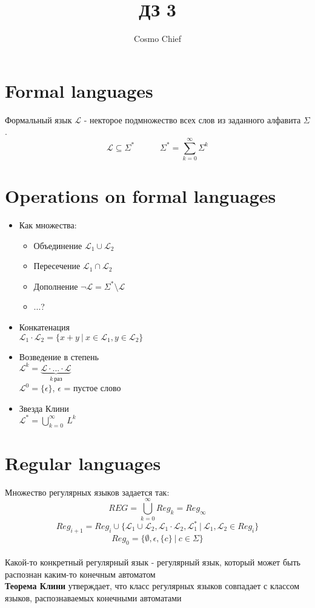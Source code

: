 \documentclass{article}
\title{ДЗ 3}
\author[1]{Cosmo Chief}
\begin{document}
	\maketitle
	\tableofcontents
	\newpage
	\section{Formal languages}
	Формальный язык $\mathcal{L}$ - некторое подмножество всех слов из заданного алфавита $\Sigma$.\\
	\[
	\mathcal{L} \subseteq \Sigma^* \quad \quad \quad \Sigma^* = \sum_{k = 0}^{\infty} \Sigma^k
	\]
	
	\section{Operations on formal languages}
	\begin{itemize}
		\item
		Как множества:
		\begin{itemize}
		\item Объединение \(\mathcal{L}_1 \cup \mathcal{L}_2\)
		\item Пересечение \(\mathcal{L}_1 \cap \mathcal{L}_2\)
		\item Дополнение \(\neg \mathcal{L} = \Sigma^* \setminus \mathcal{L}\)
		\item ...?
		\end{itemize}
		\item
		Конкатенация\\
		\(\mathcal{L}_1 \cdot \mathcal{L}_2 = \{x + y \ | \ x \in \mathcal{L}_1, y \in \mathcal{L}_2\} \)
		\item
		Возведение в степень\\
		\(\mathcal{L}^k = \underbrace{\mathcal{L} \cdot ... \cdot \mathcal{L}}_{k \ \text{раз}} \)\\
		\(\mathcal{L}^0 = \{\epsilon\}\), $\epsilon$ = пустое слово
		\item
		Звезда Клини\\
		\(\mathcal{L}^* = \bigcup^{\infty}_{k = 0} \ L^k \)
	\end{itemize}
	
	\section{Regular languages}
	Множество регулярных языков задается так:\\
	\[
	REG = \bigcup^{\infty}_{k = 0} Reg_k = Reg_{\infty}\]
	\[
	Reg_{i+1} = Reg_{i} \cup \{\mathcal{L}_1 \cup \mathcal{L}_2, \mathcal{L}_1 \cdot \mathcal{L}_2, \mathcal{L}^{*}_{1} \ | \ \mathcal{L}_1, \mathcal{L}_2 \in Reg_i\}\]
	\[
	Reg_0 = \{\emptyset, \epsilon, \{c\} \ | \ c \in \Sigma\}\]\\
	Какой-то конкретный регулярный язык - регулярный язык, который может быть распознан каким-то конечным автоматом\\
	\textbf{Теорема Клини} утверждает, что класс регулярных языков совпадает с классом языков, распознаваемых конечными автоматами
	
\end{document}
